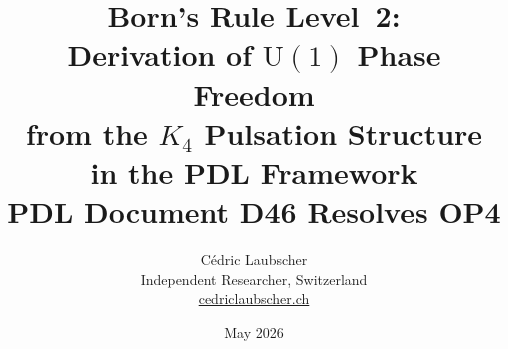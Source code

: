 \documentclass[12pt,a4paper]{article}
\begin{document}
\title{\textbf{Born's Rule Level~2:\\
Derivation of $\mathrm{U}(1)$ Phase Freedom\\
from the $K_4$ Pulsation Structure\\
in the PDL Framework}\\[6pt]
{\large PDL Document D46 \textemdash{} Resolves OP4}}

\author{Cédric Laubscher\\[4pt]
\small Independent Researcher, Switzerland\\
\small \href{https://cedriclaubscher.ch}{cedriclaubscher.ch}}

\date{May 2026}

\maketitle
\end{document}
